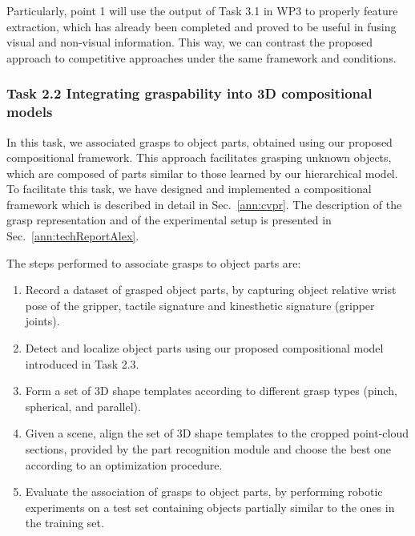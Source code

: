 \documentclass[a4paper,11pt,pdf]{pacmanreport}
\begin{document}

Particularly, point 1 will use the output of Task 3.1 in WP3 to properly feature extraction, which has already been completed and proved to be useful in fusing visual and non-visual information. This way, we can contrast the proposed approach to competitive approaches under the same framework and conditions.

\subsubsection{Task 2.2 Integrating graspability into 3D compositional models}

In this task, we associated grasps to object parts, obtained using our proposed compositional framework. This approach facilitates grasping unknown objects, which are composed of parts similar to those learned by our hierarchical model. To facilitate this task, we have designed and implemented a compositional framework which is described in detail in Sec.~\ref{ann:cvpr}. The description of the grasp representation and of the experimental setup is presented in Sec.~\ref{ann:techReportAlex}.

The steps performed to associate grasps to object parts are:
\begin{enumerate}
\item Record a dataset of grasped object parts, by capturing object relative wrist pose of the gripper, tactile signature and kinesthetic signature (gripper joints).
\item Detect and localize object parts using our proposed compositional model introduced in Task 2.3.
\item Form a set of 3D shape templates according to different grasp types (pinch, spherical, and parallel).
\item Given a scene, align the set of 3D shape templates to the cropped point-cloud sections, provided by the part recognition module and choose the best one according to an optimization procedure.
\item Evaluate the association of grasps to object parts, by performing robotic experiments on a test set containing objects partially similar to the ones in the training set.
\end{enumerate}
\end{document}

